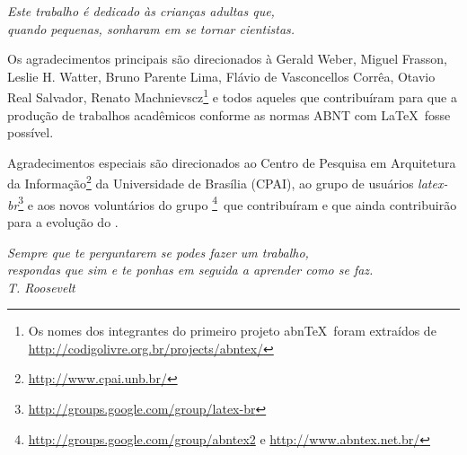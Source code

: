 \begin{dedicatoria}
    \vspace*{\fill}
    \begin{flushright}
    \noindent
    \textit{ Este trabalho é dedicado às crianças adultas que,\\
    quando pequenas, sonharam em se tornar cientistas.}\vspace*{2cm}
    \end{flushright}
 \end{dedicatoria}



\begin{agradecimentos}
    Os agradecimentos principais são direcionados à Gerald Weber, Miguel Frasson,
    Leslie H. Watter, Bruno Parente Lima, Flávio de Vasconcellos Corrêa, Otavio Real
    Salvador, Renato Machnievscz\footnote{Os nomes dos integrantes do primeiro
    projeto abn\TeX\ foram extraídos de
    \url{http://codigolivre.org.br/projects/abntex/}} e todos aqueles que
    contribuíram para que a produção de trabalhos acadêmicos conforme
    as normas ABNT com \LaTeX\ fosse possível.
    
    Agradecimentos especiais são direcionados ao Centro de Pesquisa em Arquitetura
    da Informação\footnote{\url{http://www.cpai.unb.br/}} da Universidade de
    Brasília (CPAI), ao grupo de usuários
    \emph{latex-br}\footnote{\url{http://groups.google.com/group/latex-br}} e aos
    novos voluntários do grupo
    \emph{\abnTeX}\footnote{\url{http://groups.google.com/group/abntex2} e
    \url{http://www.abntex.net.br/}}~que contribuíram e que ainda
    contribuirão para a evolução do \abnTeX.
\end{agradecimentos}


\begin{epigrafe}
    \vspace*{\fill}
    \begin{flushright}
        \textit{Sempre que te perguntarem se podes fazer um trabalho,\\
        respondas que sim e te ponhas em seguida a aprender como se faz.\\
        T. Roosevelt}
    \end{flushright}
\end{epigrafe}


